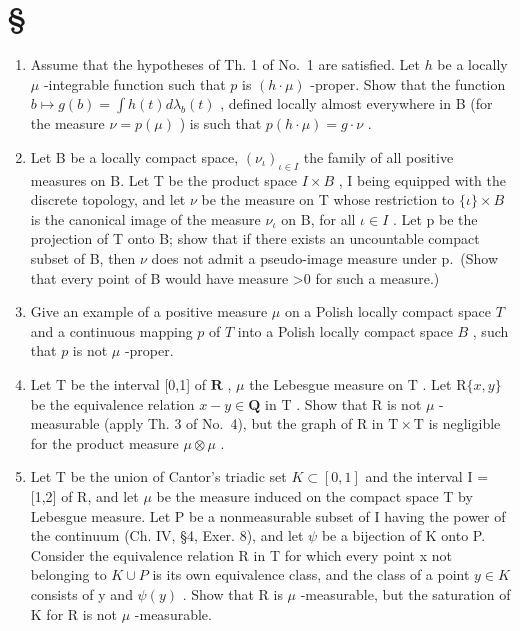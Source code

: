 \section*{\texorpdfstring{\S\CurrentExerciseGroup}{Section \CurrentExerciseGroup}}
{}

\begin{enumerate}
\def\labelenumi{\arabic{enumi})}
\item
  Assume that the hypotheses of Th. 1 of No.~1 are satisfied. Let \(h\) be a locally \(\mu\) -integrable function such that \(p\) is \((h \cdot \mu)\) -proper. Show that the function \(b \mapsto g(b) = \int h(t) d\lambda_b(t)\) , defined locally almost everywhere in B (for the measure \(\nu = p(\mu)\) ) is such that \(p(h \cdot \mu) = g \cdot \nu\) .
\item
  Let B be a locally compact space, \((\nu_{\iota})_{\iota\in I}\) the family of all positive measures on B. Let T be the product space \(I\times B\) , I being equipped with the discrete topology, and let \(\nu\) be the measure on T whose restriction to \(\{\iota\}\times B\) is the canonical image of the measure \(\nu_{\iota}\) on B, for all \(\iota\in I\) . Let p be the projection of T onto B; show that if there exists an uncountable compact subset of B, then \(\nu\) does not admit a pseudo-image measure under p.~(Show that every point of B would have measure \textgreater0 for such a measure.)
\item
  Give an example of a positive measure \(\mu\) on a Polish locally compact space \(T\) and a continuous mapping \(p\) of \(T\) into a Polish locally compact space \(B\) , such that \(p\) is not \(\mu\) -proper.
\item
  Let \(\mathrm{T}\) be the interval {[}0,1{]} of \(\mathbf{R}\) , \(\mu\) the Lebesgue measure on \(\mathrm{T}\) . Let \(\mathrm{R}\{x,y\}\) be the equivalence relation \(x - y \in \mathbf{Q}\) in \(\mathrm{T}\) . Show that \(\mathrm{R}\) is not \(\mu\) -measurable (apply Th. 3 of No.~4), but the graph of \(\mathrm{R}\) in \(\mathrm{T} \times \mathrm{T}\) is negligible for the product measure \(\mu \otimes \mu\) .
\item
  Let T be the union of Cantor's triadic set \(K \subset [0,1]\) and the interval I = {[}1,2{]} of R, and let \(\mu\) be the measure induced on the compact space T by Lebesgue measure. Let P be a nonmeasurable subset of I having the power of the continuum (Ch. IV, §4, Exer. 8), and let \(\psi\) be a bijection of K onto P. Consider the equivalence relation R in T for which every point x not belonging to \(K \cup P\) is its own equivalence class, and the class of a point \(y \in K\) consists of y and \(\psi(y)\) . Show that R is \(\mu\) -measurable, but the saturation of K for R is not \(\mu\) -measurable.

\end{enumerate}
